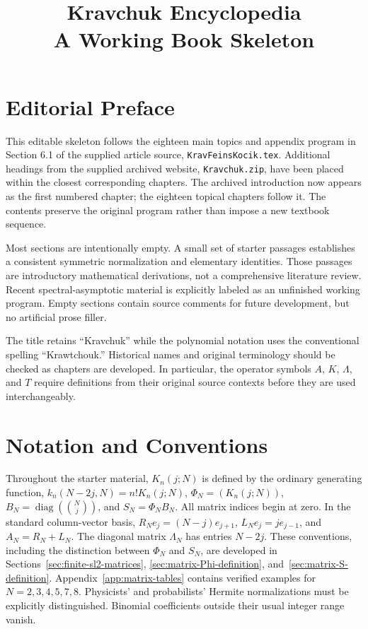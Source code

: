 \documentclass[11pt,oneside]{amsbook}
\title{Kravchuk Encyclopedia\\ A Working Book Skeleton}
\date{}
\theoremstyle{definition}
\theoremstyle{remark}
\begin{document}
\frontmatter
\maketitle
\chapter*{Editorial Preface}
This editable skeleton follows the eighteen main topics and appendix program in Section 6.1 of the supplied article source, \texttt{KravFeinsKocik.tex}. Additional headings from the supplied archived website, \texttt{Kravchuk.zip}, have been placed within the closest corresponding chapters. The archived introduction now appears as the first numbered chapter; the eighteen topical chapters follow it. The contents preserve the original program rather than impose a new textbook sequence.

Most sections are intentionally empty. A small set of starter passages establishes a consistent symmetric normalization and elementary identities. Those passages are introductory mathematical derivations, not a comprehensive literature review. Recent spectral-asymptotic material is explicitly labeled as an unfinished working program. Empty sections contain source comments for future development, but no artificial prose filler.

The title retains ``Kravchuk'' while the polynomial notation uses the conventional spelling ``Krawtchouk.'' Historical names and original terminology should be checked as chapters are developed. In particular, the operator symbols $A$, $K$, $\Lambda$, and $T$ require definitions from their original source contexts before they are used interchangeably.
\chapter*{Notation and Conventions}
Throughout the starter material, $K_n(j;N)$ is defined by the ordinary generating function, $k_n(N-2j,N)=n!K_n(j;N)$, $\Phi_N=(K_n(j;N))$, $B_N=\operatorname{diag}(\binom Nj)$, and $S_N=\Phi_NB_N$. All matrix indices begin at zero. In the standard column-vector basis,
$R_Ne_j=(N-j)e_{j+1}$, $L_Ne_j=je_{j-1}$, and $A_N=R_N+L_N$.
The diagonal matrix $\Lambda_N$ has entries $N-2j$.
These conventions, including the distinction between $\Phi_N$ and
$S_N$, are developed in Sections~\ref{sec:finite-sl2-matrices},
\ref{sec:matrix-Phi-definition}, and~\ref{sec:matrix-S-definition}.
Appendix~\ref{app:matrix-tables} contains verified examples for
$N=2,3,4,5,7,8$. Physicists' and probabilists' Hermite normalizations must be explicitly distinguished. Binomial coefficients outside their usual integer range vanish.
\end{document}
